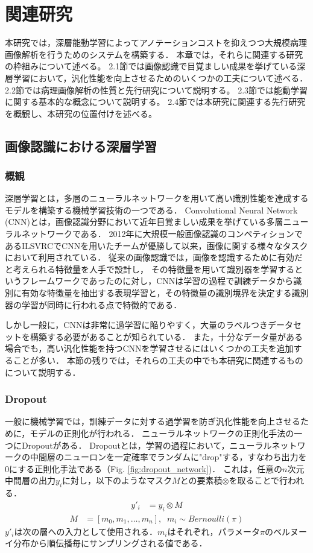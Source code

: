\chapter{関連研究}
本研究では，深層能動学習によってアノテーションコストを抑えつつ大規模病理画像解析を行うためのシステムを構築する．
本章では，それらに関連する研究の枠組みについて述べる。
2.1節では画像認識で目覚ましい成果を挙げている深層学習において，汎化性能を向上させるためのいくつかの工夫について述べる．
2.2節では病理画像解析の性質と先行研究について説明する。
2.3節では能動学習に関する基本的な概念について説明する。
2.4節では本研究に関連する先行研究を概観し、本研究の位置付けを述べる。

\section{画像認識における深層学習}
\subsection{概観}
深層学習とは，多層のニューラルネットワークを用いて高い識別性能を達成するモデルを構築する機械学習技術の一つである．
Convolutional Neural Network (CNN)とは，画像認識分野において近年目覚ましい成果を挙げている多層ニューラルネットワークである．
2012年に大規模一般画像認識のコンペティションであるILSVRC\cite{ILSVRC15}でCNNを用いたチームが優勝して以来，画像に関する様々なタスクにおいて利用されている．
従来の画像認識では，画像を認識するために有効だと考えられる特徴量を人手で設計し，
その特徴量を用いて識別器を学習するというフレームワークであったのに対し，CNNは学習の過程で訓練データから識別に有効な特徴量を抽出する表現学習と，その特徴量の識別境界を決定する識別器の学習が同時に行われる点で特徴的である．

しかし一般に，CNNは非常に過学習に陥りやすく，大量のラベルつきデータセットを構築する必要があることが知られている．
また，十分なデータ量がある場合でも，高い汎化性能を持つCNNを学習させるにはいくつかの工夫を追加することが多い．
本節の残りでは，それらの工夫の中でも本研究に関連するものについて説明する．

\subsection{\textbf{Dropout}}
一般に機械学習では，訓練データに対する過学習を防ぎ汎化性能を向上させるために，モデルの正則化が行われる．
ニューラルネットワークの正則化手法の一つにDropout\cite{hinton2012improving, srivastava2014dropout}がある．
Dropoutとは，学習の過程において，ニューラルネットワークの中間層のニューロンを一定確率でランダムに"drop"する，すなわち出力を0にする正則化手法である（Fig. \ref{fig:dropout_network})．
これは，任意の$n$次元中間層の出力$y_i$に対し，以下のようなマスク$M$との要素積$\otimes$を取ることで行われる．
\begin{eqnarray*}
    y'_i &= y_i \otimes M 
\end{eqnarray*}
\begin{eqnarray*}
    M &= [m_0, m_1, \dots, m_n],\;\; m_i \sim Bernoulli(\pi) 
\end{eqnarray*}
$y'_i$は次の層への入力として使用される．$m_i$はそれぞれ，パラメータ$\pi$のベルヌーイ分布から順伝播毎にサンプリングされる値である．

